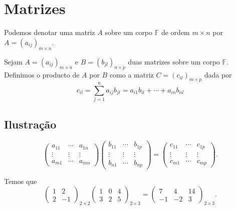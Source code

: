 \chapter{Matrizes}

Podemos denotar uma matriz $A$ sobre um corpo $\mathbb{F}$ de ordem
$m\times n$ por $A={\left(a_{ij}\right)}_{m\times n}$.

Sejam $A={\left(a_{ij}\right)}_{m\times n}$ e
$B={\left(b_{jl}\right)}_{n\times p}$ duas matrizes sobre um corpo
$\mathbb{F}$.
Definimos o producto de $A$ por $B$ como a matriz
$C={\left(c_{il}\right)}_{m\times p}$ dada por
\[
  c_{il}=
  \sum_{j=1}^{n}
  a_{i j}b_{jl}=
  a_{i1}b_{il}+\cdots+a_{in}b_{nl}
\]

\section*{Ilustração}

\[
  \begin{pmatrix}
    a_{11} & \cdots & a_{1n} \\
    \vdots & \vdots & \vdots \\
    a_{m1} & \cdots & a_{mn}
  \end{pmatrix}
  \begin{pmatrix}
    b_{11} & \cdots & b_{1p} \\
    \vdots & \vdots & \vdots \\
    b_{n1} & \cdots & b_{np}
  \end{pmatrix}=
  \begin{pmatrix}
    c_{11} & \cdots & c_{1p} \\
    \vdots & \vdots & \vdots \\
    c_{m1} & \cdots & c_{mp}
  \end{pmatrix}.
\]

\begin{example}
  Temos que
  \[
    {\begin{pmatrix}
          1 & 2  \\
          2 & -1
        \end{pmatrix}}_{2\times2}
      {\begin{pmatrix}
          1 & 0 & 4 \\
          3 & 2 & 5
        \end{pmatrix}}_{2\times3}=
    {\begin{pmatrix}
      7  & 4  & 14 \\
      -1 & -2 & 3
    \end{pmatrix}}_{2\times3}.
  \]
\end{example}

